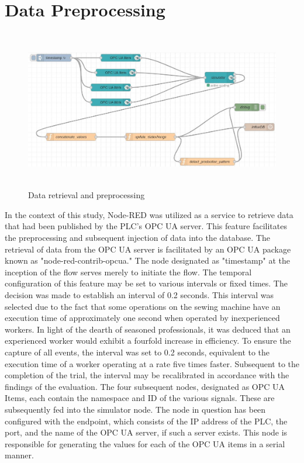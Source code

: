 \section{Data Preprocessing}
\begin{figure}[H]
	\centering
	\includegraphics[height=7cm]{pic/node-RED.jpg}
	\caption{Data retrieval and preprocessing}
	\label{fig:Model-Component-Pattern}
\end{figure}
In the context of this study, Node-RED was utilized as a service to retrieve data that had been published by the PLC's OPC UA server. This feature facilitates the preprocessing and subsequent injection of data into the database. The retrieval of data from the OPC UA server is facilitated by an OPC UA package known as "node-red-contrib-opcua." The node designated as "timestamp" at the inception of the flow serves merely to initiate the flow. The temporal configuration of this feature may be set to various intervals or fixed times. The decision was made to establish an interval of 0.2 seconds. This interval was selected due to the fact that some operations on the sewing machine have an execution time of approximately one second when operated by inexperienced workers. In light of the dearth of seasoned professionals, it was deduced that an experienced worker would exhibit a fourfold increase in efficiency. To ensure the capture of all events, the interval was set to 0.2 seconds, equivalent to the execution time of a worker operating at a rate five times faster. Subsequent to the completion of the trial, the interval may be recalibrated in accordance with the findings of the evaluation. The four subsequent nodes, designated as OPC UA Items, each contain the namespace and ID of the various signals. These are subsequently fed into the simulator node. The node in question has been configured with the endpoint, which consists of the IP address of the PLC, the port, and the name of the OPC UA server, if such a server exists. This node is responsible for generating the values for each of the OPC UA items in a serial manner.
